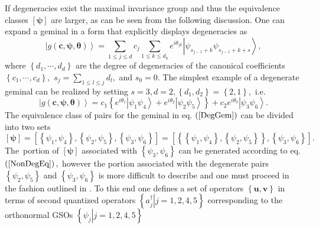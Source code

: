 \documentclass[aps,preprint]{revtex4}%
\begin{document}
If degeneracies exist the maximal invariance group and thus the equivalence
classes $\left[  \boldsymbol{\psi}\right]  $ are larger, as can be seen from
the following discussion. One can expand a geminal in a form that explicitly
displays degeneracies as
\begin{equation}
\left\vert g\left(  \boldsymbol{c},\boldsymbol{\psi},\boldsymbol{\theta
}\right)  \right\rangle =\sum_{1\leq j\leq d}c_{j}\sum_{1\leq k\leq d_{k}%
}e^{i\theta_{jk}}\left\vert \psi_{s_{j-1}+k}\psi_{s_{j-1}+k+s}\right\rangle ,
\end{equation}
where $\left\{  d_{1},\cdots,d_{d}\right\}  $ are the degree of degeneracies
of the canonical coefficients $\left\{  c_{1},\cdots,c_{d}\right\}  ,$
$s_{j}=\sum\limits_{1\leq l\leq j}d_{l},$ and $s_{0}=0.$ The simplest example
of a degenerate geminal can be realized by setting $s=3,d=2,\left\{
d_{1},d_{2}\right\}  =\left\{  2,1\right\}  ,$ i.e.
\begin{equation}
\left\vert g\left(  \boldsymbol{c},\boldsymbol{\psi},\boldsymbol{\theta
}\right)  \right\rangle =c_{1}\left\{  e^{i\theta_{1}}\left\vert \psi_{1}%
\psi_{4}\right\rangle +e^{i\theta_{2}}\left\vert \psi_{2}\psi_{5}\right\rangle
\right\}  +c_{2}e^{i\theta_{3}}\left\vert \psi_{3}\psi_{6}\right\rangle .
\label{DegGem}%
\end{equation}
The equivalence class of pairs for the geminal in eq. $\left(  \ref{DegGem}%
\right)  $ can be divided into two sets
\begin{equation}
\left[  \boldsymbol{\psi}\right]  =\left[  \left\{  \psi_{1},\psi_{4}\right\}
,\left\{  \psi_{2},\psi_{5}\right\}  ,\left\{  \psi_{3},\psi_{6}\right\}
\right]  =\left[  \left\{  \left\{  \psi_{1},\psi_{4}\right\}  ,\left\{
\psi_{2},\psi_{5}\right\}  \right\}  ,\left\{  \psi_{3},\psi_{6}\right\}
\right]  .
\end{equation}
The\ portion of $\left[  \boldsymbol{\psi}\right]  $ associated with $\left\{
\psi_{3},\psi_{6}\right\}  $ can be generated according to eq.$\left(
\ref{NonDegEq}\right)  ,$ however the portion associated with the degenerate
pairs $\left\{  \psi_{2},\psi_{5}\right\}  $ and $\left\{  \psi_{3},\psi
_{6}\right\}  $ is more difficult to describe and one must proceed in the
fashion outlined in \cite{OrtizWeiner2006,Weiner83a,AGPCoherent}. To this end
one defines a set of operators $\left\{  \boldsymbol{u},\boldsymbol{v}%
\right\}  $ in terms of second quantized operators $\left\{  \left.
a_{j}^{\dagger}\right\vert j=1,2,4,5\right\}  $ corresponding to the
orthonormal GSOs $\left\{  \left.  \psi_{j}\right\vert j=1,2,4,5\right\}  $
\end{document}
